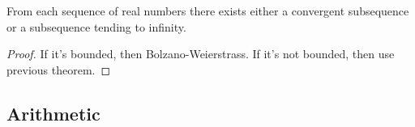   \begin{corollary}[]
    \label{thm:existence}
    From each sequence of real numbers there exists either a convergent subsequence or a subsequence tending to infinity. 
  \end{corollary}
  \begin{proof}
    If it's bounded, then Bolzano-Weierstrass. If it's not bounded, then use previous theorem. 
  \end{proof}


\subsection{Arithmetic}

